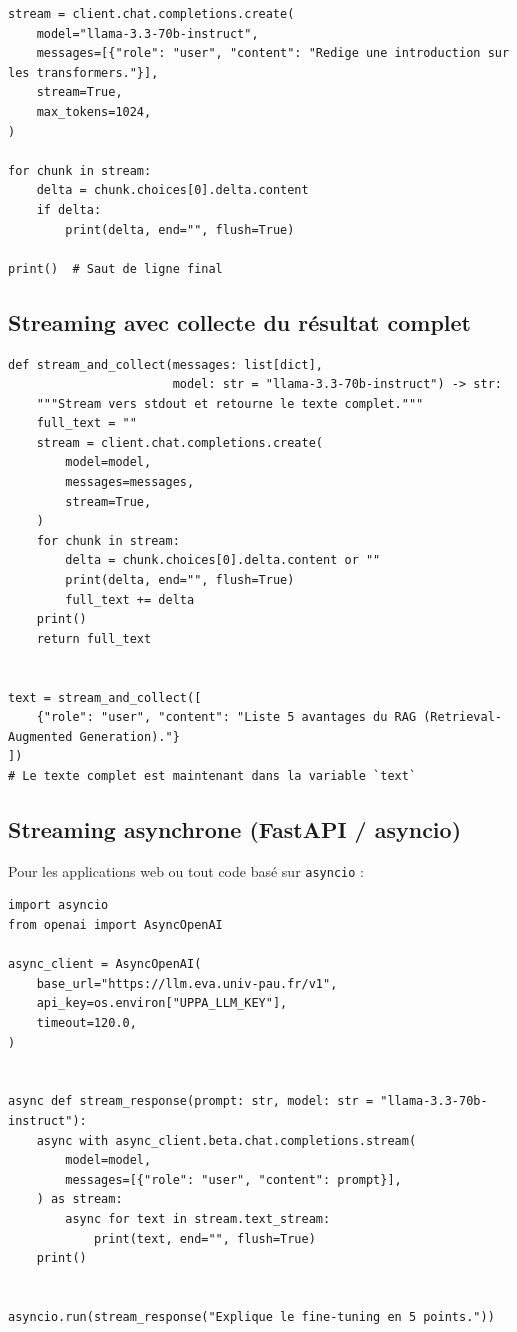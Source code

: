 \documentclass[12pt, a4paper, twoside]{article}
\begin{document}
\begin{lstlisting}[style=pythonstyle, caption={Streaming simple — affichage token par token}]
stream = client.chat.completions.create(
    model="llama-3.3-70b-instruct",
    messages=[{"role": "user", "content": "Redige une introduction sur les transformers."}],
    stream=True,
    max_tokens=1024,
)

for chunk in stream:
    delta = chunk.choices[0].delta.content
    if delta:
        print(delta, end="", flush=True)

print()  # Saut de ligne final
\end{lstlisting}

\subsection{Streaming avec collecte du résultat complet}

\begin{lstlisting}[style=pythonstyle, caption={Streaming avec accumulation du texte complet}]
def stream_and_collect(messages: list[dict],
                       model: str = "llama-3.3-70b-instruct") -> str:
    """Stream vers stdout et retourne le texte complet."""
    full_text = ""
    stream = client.chat.completions.create(
        model=model,
        messages=messages,
        stream=True,
    )
    for chunk in stream:
        delta = chunk.choices[0].delta.content or ""
        print(delta, end="", flush=True)
        full_text += delta
    print()
    return full_text


text = stream_and_collect([
    {"role": "user", "content": "Liste 5 avantages du RAG (Retrieval-Augmented Generation)."}
])
# Le texte complet est maintenant dans la variable `text`
\end{lstlisting}

\subsection{Streaming asynchrone (FastAPI / asyncio)}

Pour les applications web ou tout code basé sur \texttt{asyncio} :

\begin{lstlisting}[style=pythonstyle, caption={Streaming asynchrone avec AsyncOpenAI}]
import asyncio
from openai import AsyncOpenAI

async_client = AsyncOpenAI(
    base_url="https://llm.eva.univ-pau.fr/v1",
    api_key=os.environ["UPPA_LLM_KEY"],
    timeout=120.0,
)


async def stream_response(prompt: str, model: str = "llama-3.3-70b-instruct"):
    async with async_client.beta.chat.completions.stream(
        model=model,
        messages=[{"role": "user", "content": prompt}],
    ) as stream:
        async for text in stream.text_stream:
            print(text, end="", flush=True)
    print()


asyncio.run(stream_response("Explique le fine-tuning en 5 points."))
\end{lstlisting}
\end{document}
